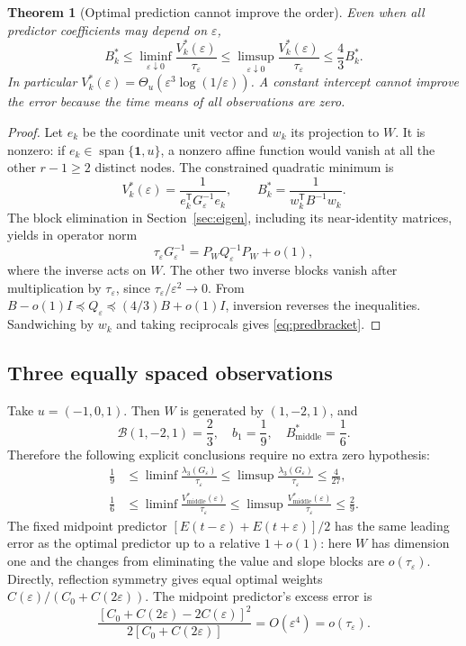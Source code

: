 \documentclass[11pt]{article}
\newtheorem{theorem}{Theorem}[section]
\theoremstyle{definition}\newtheorem{definition}[theorem]{Definition}
\theoremstyle{remark}\newtheorem{remark}[theorem]{Remark}
\newcommand{\eps}{\varepsilon}
\newcommand{\one}{\mathbf1}
\newcommand{\tr}{\mathsf T}
\newcommand{\tauE}{\tau_\eps}
\newcommand{\bB}{\mathcal B}
\DeclareMathOperator{\spanop}{span}
\begin{document}
\begin{theorem}[Optimal prediction cannot improve the order]\label{thm:predict}
Even when all predictor coefficients may depend on $\eps$,
\begin{equation}\label{eq:predbracket}
 B_k^*\le\liminf_{\eps\downarrow0}\frac{V_k^*(\eps)}{\tauE}
 \le\limsup_{\eps\downarrow0}\frac{V_k^*(\eps)}{\tauE}
 \le\frac43B_k^*.
\end{equation}
In particular $V_k^*(\eps)=\Theta_u(\eps^3\log(1/\eps))$.
A constant intercept cannot improve the error because the time means
of all observations are zero.
\end{theorem}
\begin{proof}
Let $e_k$ be the coordinate unit vector and $w_k$ its projection to $W$.
It is nonzero: if $e_k\in\spanop\{\one,u\}$, a nonzero affine function
would vanish at all the other $r-1\ge2$ distinct nodes.
The constrained quadratic minimum is
\[
 V_k^*(\eps)=\frac1{e_k^\tr G_\eps^{-1}e_k},\qquad
 B_k^*=\frac1{w_k^\tr B^{-1}w_k}.
\]
The block elimination in Section~\ref{sec:eigen}, including its
near-identity matrices, yields in operator norm
\[
 \tauE G_\eps^{-1}=
     P_W Q_\eps^{-1}P_W+o(1),
\]
where the inverse acts on $W$. The other two inverse blocks vanish
after multiplication by $\tauE$, since $\tauE/\eps^2\to0$.
From $B-o(1)I\preceq Q_\eps\preceq(4/3)B+o(1)I$, inversion reverses
the inequalities. Sandwiching by $w_k$ and taking reciprocals gives
\eqref{eq:predbracket}.
\end{proof}

\subsection{Three equally spaced observations}
Take $u=(-1,0,1)$. Then $W$ is generated by $(1,-2,1)$, and
\[
 \bB(1,-2,1)=\frac23,\quad
 b_1=\frac19,\quad B_{\mathrm{middle}}^*=\frac16.
\]
Therefore the following explicit conclusions require no extra zero
hypothesis:
\begin{align}
 \frac19&\le\liminf\frac{\lambda_3(G_\eps)}{\tauE}
       \le\limsup\frac{\lambda_3(G_\eps)}{\tauE}\le\frac4{27},\label{eq:threeeig}\\
 \frac16&\le\liminf\frac{V_{\mathrm{middle}}^*(\eps)}{\tauE}
       \le\limsup\frac{V_{\mathrm{middle}}^*(\eps)}{\tauE}\le\frac29.
 \label{eq:threepred}
\end{align}
The fixed midpoint predictor
$[E(t-\eps)+E(t+\eps)]/2$ has the same leading error as the optimal
predictor up to a relative $1+o(1)$: here $W$ has dimension one and the
changes from eliminating the value and slope blocks are $o(\tauE)$.
Directly, reflection symmetry gives equal optimal weights
$C(\eps)/(C_0+C(2\eps))$. The midpoint predictor's excess error is
\[
 \frac{[C_0+C(2\eps)-2C(\eps)]^2}{2[C_0+C(2\eps)]}
 =O(\eps^4)=o(\tauE).
\]
\end{document}
